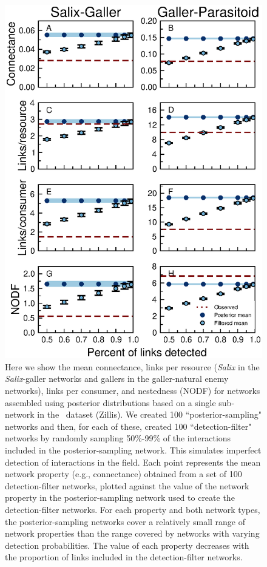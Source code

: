 \documentclass[12pt]{article}
\begin{document}
    \begin{figure}[ht]
    \caption{Here we show the mean connectance, links per resource (\emph{Salix} in the \emph{Salix}-galler networks and gallers in the galler-natural enemy networks), links per consumer, and nestedness (NODF) for networks assembled using posterior distributions based on a single sub-network in the~\citet{Kopelke2017} dataset (Zillis). We created 100 ``posterior-sampling" networks and then, for each of these, created 100 ``detection-filter" networks by randomly sampling 50\%-99\% of the interactions included in the posterior-sampling network. This simulates imperfect detection of interactions in the field. Each point represents the mean network property (e.g., connectance) obtained from a set of 100 detection-filter networks, plotted against the value of the network property in the posterior-sampling network used to create the detection-filter networks. For each property and both network types, the posterior-sampling networks cover a relatively small range of network properties than the range covered by networks with varying detection probabilities. The value of each property decreases with the proportion of links included in the detection-filter networks.}
    \label{posterior_webs}    
    \includegraphics[width=.8\textwidth]{Figures/Salix_Galler_posterior_properties_Zillis.eps}
    \end{figure}



\clearpage

     
\end{document}
